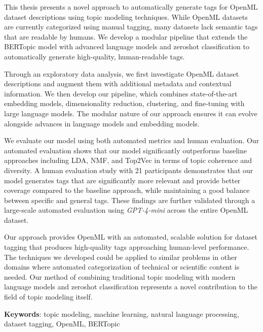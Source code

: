 This thesis presents a novel approach to automatically generate tags for OpenML dataset descriptions using topic modeling techniques. While OpenML datasets are currently categorized using manual tagging, many datasets lack semantic tags that are readable by humans. We develop a modular pipeline that extends the BERTopic model with advanced language models and zeroshot classification to automatically generate high-quality, human-readable tags.

Through an exploratory data analysis, we first investigate OpenML dataset descriptions and augment them with additional metadata and contextual information. We then develop our pipeline, which combines state-of-the-art embedding models, dimensionality reduction, clustering, and fine-tuning with large language models. The modular nature of our approach ensures it can evolve alongside advances in language models and embedding models.

We evaluate our model using both automated metrics and human evaluation. Our automated evaluation shows that our model significantly outperforms baseline approaches including LDA, NMF, and Top2Vec in terms of topic coherence and diversity. A human evaluation study with 21 participants demonstrates that our model generates tags that are significantly more relevant and provide better coverage compared to the baseline approach, while maintaining a good balance between specific and general tags. These findings are further validated through a large-scale automated evaluation using \textit{GPT-4-mini} across the entire OpenML dataset.

Our approach provides OpenML with an automated, scalable solution for dataset tagging that produces high-quality tags approaching human-level performance. The techniques we developed could be applied to similar problems in other domains where automated categorization of technical or scientific content is needed. Our method of combining traditional topic modeling with modern language models and zeroshot classification represents a novel contribution to the field of topic modeling itself.

\textbf{Keywords}: topic modeling, machine learning, natural language processing, dataset tagging, OpenML, BERTopic

